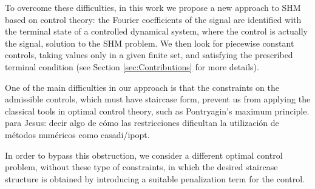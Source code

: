 \documentclass[twocolumn]{autart}    %
\begin{document}
To overcome these difficulties, in this work we propose a new approach to SHM based on control theory: the Fourier coefficients of the signal are identified with the terminal state of a controlled dynamical system, where the control is actually the signal, solution to the SHM problem. We then look for piecewise constant controls, taking values only in a given finite set, and satisfying the prescribed terminal condition (see Section \ref{sec:Contributions} for more details). 

%

One of the main difficulties in our approach is  that the constraints on the admissible controls, which must have staircase form,  prevent us from applying the classical tools in optimal control theory, such as Pontryagin's maximum principle. 
{\color{red} para Jesus: decir algo de cómo las restricciones dificultan la utilización de métodos numéricos como casadi/ipopt. }

In order to bypass this obstruction, we consider a different optimal control problem, without these type of constraints, in which the desired staircase structure is obtained by introducing a suitable penalization term for the control. 
\end{document}

